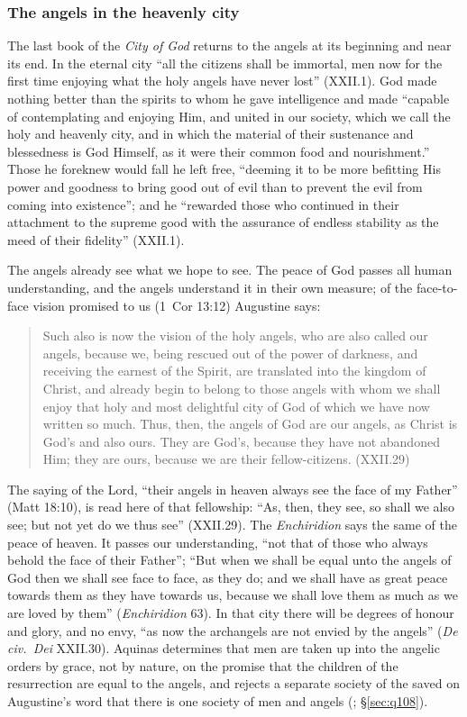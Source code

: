 \subsubsection{The angels in the heavenly city}\label{sec:aug-vision}

The last book of the \emph{City of God} returns to the angels at its
beginning and near its end. In the eternal city ``all the citizens shall
be immortal, men now for the first time enjoying what the holy angels
have never lost'' (XXII.1). God made nothing better than the spirits to
whom he gave intelligence and made ``capable of contemplating and
enjoying Him, and united in our society, which we call the holy and
heavenly city, and in which the material of their sustenance and
blessedness is God Himself, as it were their common food and
nourishment.'' Those he foreknew would fall he left free, ``deeming it
to be more befitting His power and goodness to bring good out of evil than
to prevent the evil from coming into existence''; and he ``rewarded those
who continued in their attachment to the
supreme good with the assurance of endless stability as the meed of their
fidelity'' (XXII.1).

The angels already see what we hope to see. The peace of God passes all
human understanding, and the angels understand it in their own measure;
of the face-to-face vision promised to us (1~Cor 13:12) Augustine says:
\begin{quote}
Such also is now the vision of the holy angels, who are also called our
angels, because we, being rescued out of the power of darkness, and
receiving the earnest of the Spirit, are translated into the kingdom of
Christ, and already begin to belong to those angels with whom we shall
enjoy that holy and most delightful city of God of which we have now
written so much. Thus, then, the angels of God are our angels, as Christ
is God's and also ours. They are God's, because they have not abandoned
Him; they are ours, because we are their fellow-citizens. (XXII.29)
\end{quote}
The saying of the Lord, ``their angels in heaven always see the face of my
Father'' (Matt 18:10), is read here of that fellowship: ``As, then, they
see, so shall we also see; but not yet do we thus see'' (XXII.29). The
\emph{Enchiridion} says the same of the peace of heaven. It passes our
understanding, ``not that of those who always behold the face of their
Father''; ``But when we shall be equal unto the angels of God then we
shall see face to face, as they do; and we shall have as great peace
towards them as they have towards us, because we shall love them as much
as we are loved by them'' (\emph{Enchiridion} 63). In that city there
will be degrees of honour and glory, and no envy, ``as now the archangels
are not envied by the angels'' (\emph{De civ.\ Dei} XXII.30). Aquinas
determines that men are taken up into the angelic orders by grace, not by
nature, on the promise that the children of the resurrection are equal to
the angels, and rejects a separate society of the saved on Augustine's
word that there is one society of men and angels (;
\S\ref{sec:q108}).

